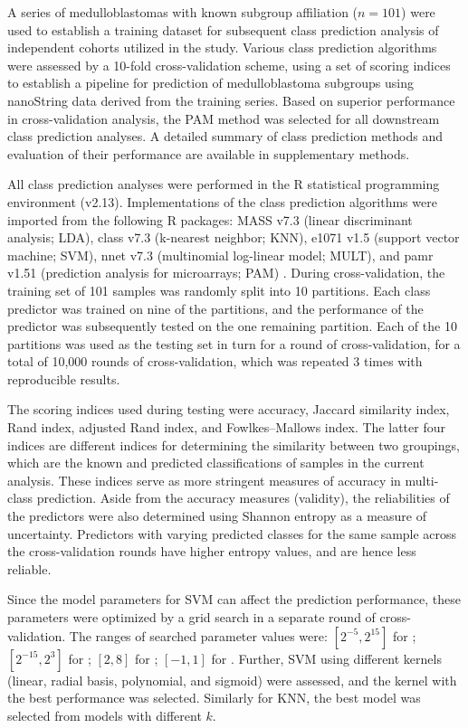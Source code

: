 A series of medulloblastomas with known subgroup affiliation ($n = 101$) were used to establish a training dataset for subsequent class prediction analysis of independent cohorts utilized in the study.  Various class prediction algorithms were assessed by a 10-fold cross-validation scheme, using a set of scoring indices to establish a pipeline for prediction of medulloblastoma subgroups using nanoString data derived from the training series.  Based on superior performance in cross-validation analysis, the PAM method was selected for all downstream class prediction analyses.  A detailed summary of class prediction methods and evaluation of their performance are available in supplementary methods.

All class prediction analyses were performed in the R statistical programming environment (v2.13). Implementations of the class prediction algorithms were imported from the following R packages: MASS v7.3 (linear discriminant analysis; LDA), class v7.3 (k-nearest neighbor; KNN), e1071 v1.5 (support vector machine; SVM), nnet v7.3 (multinomial log-linear model; MULT), and pamr v1.51 (prediction analysis for microarrays; PAM) . During cross-validation, the training set of 101 samples was randomly split into 10 partitions. Each class predictor was trained on nine of the partitions, and the performance of the predictor was subsequently tested on the one remaining partition. Each of the 10 partitions was used as the testing set in turn for a round of cross-validation, for a total of 10,000 rounds of cross-validation, which was
repeated 3 times with reproducible results.

The scoring indices used during testing were accuracy, Jaccard similarity index, Rand index, adjusted Rand index, and Fowlkes–Mallows index. The latter four indices are different indices for determining the similarity between two groupings, which are the known and predicted classifications of samples in the current analysis. These indices serve as more stringent measures of accuracy in multi-class prediction. Aside from the accuracy measures (validity), the reliabilities of the predictors were also determined using Shannon entropy as a measure of uncertainty. Predictors with varying predicted classes for the same sample across the cross-validation rounds have higher entropy values, and are hence less reliable.

Since the model parameters for SVM can affect the prediction performance, these parameters were optimized by a grid search in a separate round of cross-validation. The ranges of searched parameter values were: $[2^{-5}, 2^{15}]$ for ; $[2^{-15}, 2^3]$ for ; $[2, 8]$ for ; $[-1, 1]$ for . Further, SVM using different kernels (linear, radial basis, polynomial, and sigmoid) were assessed, and the kernel with the best performance was selected. Similarly for KNN, the best model was selected from models with different $k$.


